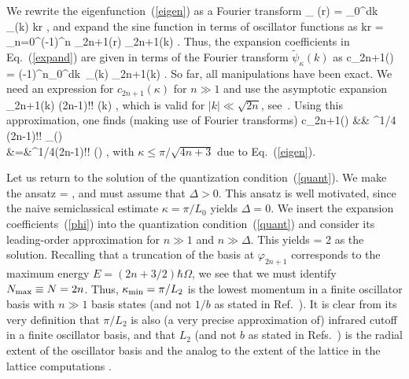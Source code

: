 	We rewrite the eigenfunction~(\ref{eigen}) as a Fourier transform
	\beq
	\psi_{\kappa} (r) = \sqrt{2\over \pi} \int\limits_0^\infty dk
	\tilde{\psi}_{\kappa}(k) \sin kr \; ,
	\eeq
	and expand the sine function in terms of oscillator functions as
	\beq
	\sin kr =  \sum_{n=0}^\infty (-1)^n \varphi_{2n+1}(r)
	\varphi_{2n+1}(k) \; .
	\eeq
	Thus, the expansion coefficients in Eq.~(\ref{expand}) are given in
	terms of the Fourier transform $\tilde{\psi}_\kappa(k)$ as
	\beq
	\label{integ}
	c_{2n+1}(\kappa) = (-1)^n\int\limits_0^\infty dk\, \tilde{\psi}_{\kappa}(k)
	\varphi_{2n+1}(k) \; .
	\eeq
	So far, all manipulations have been exact.  We need an expression for
	$c_{2n+1}(\kappa)$ for $n\gg 1$ and use the asymptotic expansion
	\beq
	\label{approxwf}
	\varphi_{2n+1}(k) 
	{(2n-1)!!\over {}}
	\sin (k) \; ,
	\eeq
	which is valid for $|k|\ll \sqrt{2n}$, see~\cite{gradshteyn}.
	Using this approximation, one finds (making use of Fourier transforms)
	\bea
	\label{phi}
	c_{2n+1}(\kappa) &\approx& \pi^{1/4} {(2n-1)!!\over {}}
	\psi_{\kappa}() \nonumber\\
	&=&\pi^{1/4}{(2n-1)!!\over {}}
	\sin (\kappa) \; ,
	\eea
	with $\kappa \le \pi/\sqrt{4n+3}$ due to Eq.~(\ref{eigen}).

	Let us return to the solution of the quantization
	condition~(\ref{quant}).  We make the ansatz
	\beq
	\kappa = {\pi\over{}} \; ,
	\eeq
	and must assume that $\Delta > 0$.  This ansatz is well motivated, since the
	naive semiclassical estimate $\kappa = \pi/L_0$ yields $\Delta=0$. We
	insert the expansion coefficients~(\ref{phi}) into the quantization
	condition~(\ref{quant}) and consider its leading-order approximation
	for $n\gg 1$ and $n\gg \Delta$. This yields
	\beq
	\Delta = 2
	\eeq
	as the solution. Recalling that a truncation of the basis at
	$\varphi_{2n+1}$ corresponds to the maximum energy
	$E=(2n+3/2)\hbar\Omega$, we see that we must identify
	${N_{\mathrm{max}}} \equiv N = 2n$. Thus,
	$\kappa_{\rm min} = \pi/L_2$ is the lowest momentum in a finite
	oscillator basis with $n \gg 1$ basis states (and not $1/b$ as stated in
	Ref.~\cite{Coon:2012ab}).  It is clear from its
	very definition that $\pi/L_2$ is also (a very precise approximation of)
	infrared cutoff in a finite	oscillator basis, and that $L_2$ (and not $b$
	as stated in Refs.~\cite{Stetcu:2006ey,Stetcu:2007ms}) is the radial extent
	of the oscillator basis and the analog to the extent of the lattice in the
	lattice computations \cite{Luscher:1985dn}.

